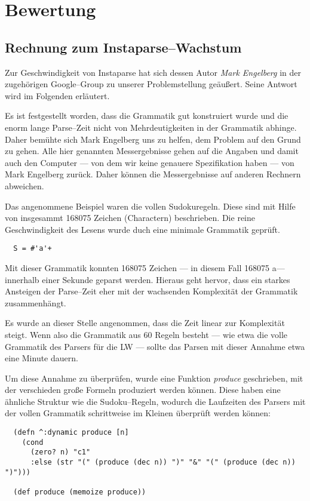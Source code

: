 \documentclass[ngerman,a4paper,abstracton,open=right,twoside=false,toc=listofnumbered,bibtotocnumbered]{scrreprt}
\begin{document}
\chapter{Bewertung}
\section{Rechnung zum Instaparse--Wachstum}

Zur Geschwindigkeit von Instaparse hat sich dessen Autor \emph{Mark Engelberg} in der zugehörigen Google--Group zu unserer Problemstellung geäußert. Seine Antwort wird im Folgenden erläutert.

Es ist festgestellt worden, dass die Grammatik gut konstruiert wurde und die enorm lange Parse--Zeit nicht von Mehrdeutigkeiten in der Grammatik abhinge. Daher bemühte sich Mark Engelberg uns zu helfen, dem Problem auf den Grund zu gehen. Alle hier genannten Messergebnisse gehen auf die Angaben und damit auch den Computer --- von dem wir keine genauere Spezifikation haben --- von Mark Engelberg zurück. Daher können die Messergebnisse auf anderen Rechnern abweichen.

Das angenommene Beispiel waren die vollen Sudokuregeln. Diese sind mit Hilfe von insgesammt 168075 Zeichen (Charactern) beschrieben. Die reine Geschwindigkeit des Lesens wurde duch eine minimale Grammatik geprüft.

\begin{lstlisting}
  S = #'a'+
\end{lstlisting}

Mit dieser Grammatik konnten 168075 Zeichen --- in diesem Fall 168075 \glqq a\grqq --- innerhalb einer Sekunde geparst werden. Hieraus geht hervor, dass ein starkes Ansteigen der Parse--Zeit eher mit der wachsenden Komplexität der Grammatik zusammenhängt.

Es wurde an dieser Stelle angenommen, dass die Zeit linear zur Komplexität steigt. Wenn also die Grammatik aus 60 Regeln besteht --- wie etwa die volle Grammatik des Parsers für die LW --- sollte das Parsen mit dieser Annahme etwa eine Minute dauern.

Um diese Annahme zu überprüfen, wurde eine Funktion \emph{produce} geschrieben, mit der verschieden große Formeln produziert werden können. Diese haben eine ähnliche Struktur wie die Sudoku--Regeln, wodurch die Laufzeiten des Parsers mit der vollen Grammatik schrittweise im Kleinen überprüft werden können:

\begin{lstlisting}
  (defn ^:dynamic produce [n]
    (cond
      (zero? n) "c1"
      :else (str "(" (produce (dec n)) ")" "&" "(" (produce (dec n)) ")")))

  (def produce (memoize produce))
\end{lstlisting}
\end{document}
